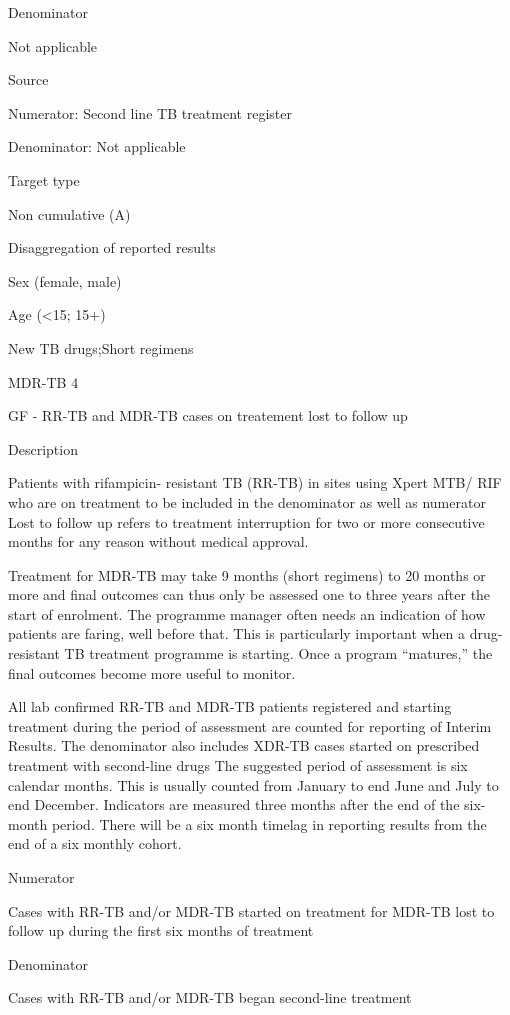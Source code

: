 \documentclass[]{book}
\begin{document}
Denominator

Not applicable

Source

Numerator: Second line TB treatment register

Denominator: Not applicable

Target type

Non cumulative (A)

Disaggregation of reported results

Sex (female, male)

Age (\textless{}15; 15+)

New TB drugs;Short regimens

MDR-TB 4

GF - RR-TB and MDR-TB cases on treatement lost to follow up

Description

Patients with rifampicin- resistant TB (RR-TB) in sites using Xpert MTB/ RIF who are on treatment to be included in the denominator as well as numerator
Lost to follow up refers to treatment interruption for two or more consecutive months for any reason without medical approval.

Treatment for MDR-TB may take 9 months (short regimens) to 20 months or more and final outcomes can thus only be assessed one to three years after the start of enrolment. The programme manager often needs an indication of how patients are faring, well before that. This is particularly important when a drug-resistant TB treatment programme is starting. Once a program ``matures,'' the final outcomes become more useful to monitor.

All lab confirmed RR-TB and MDR-TB patients registered and starting treatment during the period of assessment are counted for reporting of Interim Results. The denominator also includes XDR-TB cases started on prescribed treatment with second-line drugs
The suggested period of assessment is six calendar months. This is usually counted from January to end June and July to end December. Indicators are measured three months after the end of the six-month period. There will be a six month timelag in reporting results from the end of a six monthly cohort.

Numerator

Cases with RR-TB and/or MDR-TB started on treatment for MDR-TB lost to follow up during the first six months of treatment

Denominator

Cases with RR-TB and/or MDR-TB began second-line treatment
\end{document}
